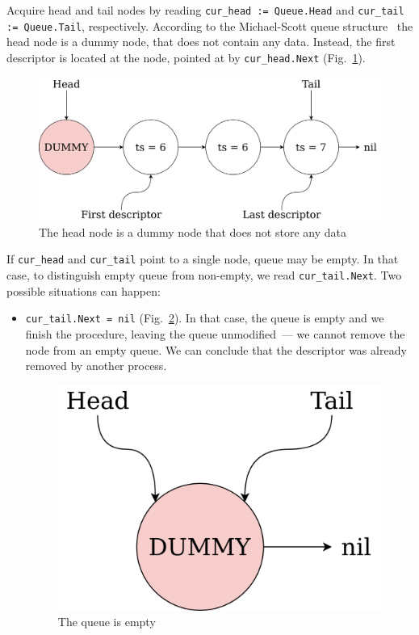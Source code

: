 \documentclass[times, dvipsnames,%
               languages={russian,english} %
              ]{itmo-student-thesis}
\begin{document}
\begin{nenum}
    \item Acquire head and tail nodes by reading \texttt{cur\_head := Queue.Head} and \texttt{cur\_tail := Queue.Tail}, respectively. According to the Michael-Scott queue structure~\cite{michael1996simple} the head node is a dummy node, that does not contain any data. Instead, the first descriptor is located at the node, pointed at by \texttt{cur\_head.Next} (Fig.~\ref{ms-queue-dummy-pic}). 
    
    \begin{figure}[H]
      \centering
      \caption{The head node is a dummy node that does not store any data}
      \label{ms-queue-dummy-pic}
      \includegraphics[width=\linewidth]{pics/ms-queue-dummy.png}
    \end{figure}
    
    \item If \texttt{cur\_head} and \texttt{cur\_tail} point to a single node, queue may be empty. In that case, to distinguish empty queue from non-empty, we read \texttt{cur\_tail.Next}. Two possible situations can happen:
    
    \begin{itemize}
        \item \texttt{cur\_tail.Next = nil} (Fig.~\ref{queue-pop-empty-pic}). In that case, the queue is empty and we finish the procedure, leaving the queue unmodified~--- we cannot remove the node from an empty queue. We can conclude that the descriptor was already removed by another process. 
        
        \begin{figure}[H]
          \centering
          \caption{The queue is empty}
          \label{queue-pop-empty-pic}
          \includegraphics[width=0.5\linewidth]{pics/queue-pop-empty.png}
        \end{figure}
        

\end{itemize}
\end{nenum}
\end{document}
